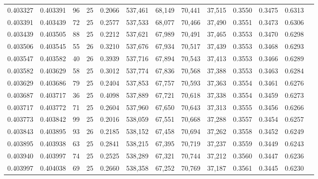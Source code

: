 \begin{tabular}{rrrrrrrrrrrrr}
0.403327 & 0.403391 &    96 &  25 &                                     0.2066 & 537,461 &  68,149 &  70,441 &  37,515 & 0.3550 & 0.3475 & 0.6313 \\
0.403391 & 0.403439 &    72 &  25 &                                     0.2577 & 537,533 &  68,077 &  70,466 &  37,490 & 0.3551 & 0.3473 & 0.6306 \\
0.403439 & 0.403505 &    88 &  25 &                                     0.2212 & 537,621 &  67,989 &  70,491 &  37,465 & 0.3553 & 0.3470 & 0.6298 \\
0.403506 & 0.403545 &    55 &  26 &                                     0.3210 & 537,676 &  67,934 &  70,517 &  37,439 & 0.3553 & 0.3468 & 0.6293 \\
0.403547 & 0.403582 &    40 &  26 &                                     0.3939 & 537,716 &  67,894 &  70,543 &  37,413 & 0.3553 & 0.3466 & 0.6289 \\
0.403582 & 0.403629 &    58 &  25 &                                     0.3012 & 537,774 &  67,836 &  70,568 &  37,388 & 0.3553 & 0.3463 & 0.6284 \\
0.403629 & 0.403686 &    79 &  25 &                                     0.2404 & 537,853 &  67,757 &  70,593 &  37,363 & 0.3554 & 0.3461 & 0.6276 \\
0.403687 & 0.403717 &    36 &  25 &                                     0.4098 & 537,889 &  67,721 &  70,618 &  37,338 & 0.3554 & 0.3459 & 0.6273 \\
0.403717 & 0.403772 &    71 &  25 &                                     0.2604 & 537,960 &  67,650 &  70,643 &  37,313 & 0.3555 & 0.3456 & 0.6266 \\
0.403773 & 0.403842 &    99 &  25 &                                     0.2016 & 538,059 &  67,551 &  70,668 &  37,288 & 0.3557 & 0.3454 & 0.6257 \\
0.403843 & 0.403895 &    93 &  26 &                                     0.2185 & 538,152 &  67,458 &  70,694 &  37,262 & 0.3558 & 0.3452 & 0.6249 \\
0.403895 & 0.403938 &    63 &  25 &                                     0.2841 & 538,215 &  67,395 &  70,719 &  37,237 & 0.3559 & 0.3449 & 0.6243 \\
0.403940 & 0.403997 &    74 &  25 &                                     0.2525 & 538,289 &  67,321 &  70,744 &  37,212 & 0.3560 & 0.3447 & 0.6236 \\
0.403997 & 0.404038 &    69 &  25 &                                     0.2660 & 538,358 &  67,252 &  70,769 &  37,187 & 0.3561 & 0.3445 & 0.6230 \\

\end{tabular}
